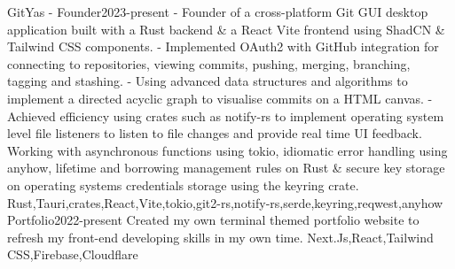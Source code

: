 
\begin{projects}
    \project
        {GitYas - Founder}{2023-present}
        {}
        {- Founder of a cross-platform Git GUI desktop application built with a Rust backend \& a React Vite frontend using ShadCN \& Tailwind CSS components.
        \newline
        - Implemented OAuth2 with GitHub integration for connecting to repositories, viewing commits, pushing, merging, branching, tagging and stashing.
        \newline
        - Using advanced data structures and algorithms to implement a directed acyclic graph to visualise commits on a HTML canvas.
        \newline
        - Achieved efficiency using crates such as notify-rs to implement operating system level file listeners to listen to file changes and provide real time UI feedback.
        \newline
        Working with asynchronous functions using tokio, idiomatic error handling using anyhow, lifetime and borrowing management rules on Rust \& secure key storage on operating systems credentials storage using the keyring crate.}
        {Rust,Tauri,crates,React,Vite,tokio,git2-rs,notify-rs,serde,keyring,reqwest,anyhow}
    \project
	{Portfolio}{2022-present}
	{}
	{Created my own terminal themed portfolio website to refresh my front-end developing skills in my own time.}
	{Next.Js,React,Tailwind CSS,Firebase,Cloudflare}
\end{projects}